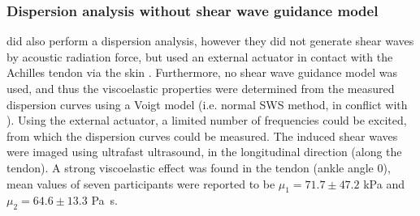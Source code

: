 \subsubsection{Dispersion analysis without shear wave guidance model}
\citeauthor{cortes_continuous_2015} did also perform a dispersion analysis, however they did not generate shear waves by acoustic radiation force, but used an external actuator in contact with the Achilles tendon via the skin \cite{cortes_continuous_2015}. Furthermore, no shear wave guidance model was used, and thus the viscoelastic properties were determined from the measured dispersion curves using a Voigt model (i.e. normal SWS method, in conflict with \cite{brum_vivo_2014, helfenstein-didier_vivo_2016}). Using the external actuator, a limited number of frequencies could be excited, from which the dispersion curves could be measured. The induced shear waves were imaged using ultrafast ultrasound, in the longitudinal direction (along the tendon). A strong viscoelastic effect was found in the tendon (ankle angle \SI{0}{\deg}), mean values of seven participants were reported to be $\mu_1 = 71.7 \pm 47.2$ \si{\kilo\pascal} and $\mu_2 = 64.6 \pm 13.3$ \si{\pascal\second}. 

	
	




